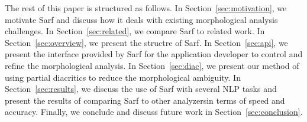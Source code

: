 The rest of this paper is structured as follows. 
 In Section~\ref{sec:motivation}, we motivate Sarf and discuss how it deals with existing morphological analysis challenges. 
In Section~\ref{sec:related}, we compare Sarf to related work. 
In Section~\ref{sec:overview}, we present the structre of Sarf. 
In Section~\ref{sec:api}, we present the interface provided by Sarf for the 
application developer to control and refine the morphological analysis. 
In Section~\ref{sec:diac}, we present our method of using partial diacritics to reduce the morphological ambiguity.
In Section~\ref{sec:results}, we discuss the use of Sarf with several NLP tasks and 
present the results of comparing Sarf to other analyzersin terms of speed and accuracy.%
Finally, we conclude and discuss future work in Section~\ref{sec:conclusion}.

